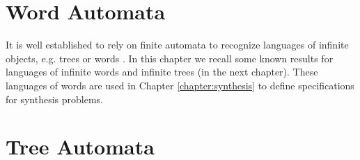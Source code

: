 \chapter{Word Automata}
It is well established to rely on finite automata to recognize languages of 
infinite objects, e.g. trees or words \cite{LangAutoLog}. In this chapter we
recall some known results for languages of infinite words and infinite trees 
(in the next chapter). These languages of words are used in Chapter 
\ref{chapter:synthesis} to define specifications for synthesis problems.





\chapter{Tree Automata}



